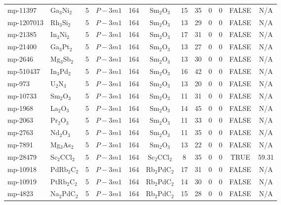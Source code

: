 {\begin{longtable}{llcccccccccc}
    mp-11397 & Ga$_{3}$Ni$_{2}$ & 5     & $P-3m1$ & 164   & Sm$_{2}$O$_{3}$ & 15    & 35    & 0     & 0     & FALSE & N/A \\
    mp-1207013 & Rh$_{3}$Si$_{2}$ & 5     & $P-3m1$ & 164   & Sm$_{2}$O$_{3}$ & 13    & 29    & 0     & 0     & FALSE & N/A \\
    mp-21385 & In$_{3}$Ni$_{2}$ & 5     & $P-3m1$ & 164   & Sm$_{2}$O$_{3}$ & 17    & 31    & 0     & 0     & FALSE & N/A \\
    mp-21400 & Ga$_{3}$Pt$_{2}$ & 5     & $P-3m1$ & 164   & Sm$_{2}$O$_{3}$ & 13    & 27    & 0     & 0     & FALSE & N/A \\
    mp-2646 & Mg$_{3}$Sb$_{2}$ & 5     & $P-3m1$ & 164   & Sm$_{2}$O$_{3}$ & 13    & 30    & 0     & 0     & FALSE & N/A \\
    mp-510437 & In$_{3}$Pd$_{2}$ & 5     & $P-3m1$ & 164   & Sm$_{2}$O$_{3}$ & 16    & 42    & 0     & 0     & FALSE & N/A \\
    mp-973 & U$_{2}$N$_{3}$ & 5     & $P-3m1$ & 164   & Sm$_{2}$O$_{3}$ & 13    & 20    & 0     & 0     & FALSE & N/A \\
    mp-10733 & Sm$_{2}$O$_{3}$ & 5     & $P-3m1$ & 164   & Sm$_{2}$O$_{3}$ & 11    & 31    & 0     & 0     & FALSE & N/A \\
    mp-1968 & La$_{2}$O$_{3}$ & 5     & $P-3m1$ & 164   & Sm$_{2}$O$_{3}$ & 14    & 45    & 0     & 0     & FALSE & N/A \\
    mp-2063 & Pr$_{2}$O$_{3}$ & 5     & $P-3m1$ & 164   & Sm$_{2}$O$_{3}$ & 11    & 33    & 0     & 0     & FALSE & N/A \\
    mp-2763 & Nd$_{2}$O$_{3}$ & 5     & $P-3m1$ & 164   & Sm$_{2}$O$_{3}$ & 11    & 35    & 0     & 0     & FALSE & N/A \\
    mp-7891 & Mg$_{3}$As$_{2}$ & 5     & $P-3m1$ & 164   & Sm$_{2}$O$_{3}$ & 13    & 22    & 0     & 0     & FALSE & N/A \\
    mp-28479 & Sc$_{2}$CCl$_{2}$ & 5     & $P-3m1$ & 164   & Sc$_{2}$CCl$_{2}$ & 8     & 35    & 0     & 0     & TRUE  & 59.31  \\
    mp-10918 & PdRb$_{2}$C$_{2}$ & 5     & $P-3m1$ & 164   & Rb$_{2}$PdC$_{2}$ & 17    & 31    & 0     & 0     & FALSE & N/A \\
    mp-10919 & PtRb$_{2}$C$_{2}$ & 5     & $P-3m1$ & 164   & Rb$_{2}$PdC$_{2}$ & 14    & 30    & 0     & 0     & FALSE & N/A \\
    mp-4823 & Na$_{2}$PdC$_{2}$ & 5     & $P-3m1$ & 164   & Rb$_{2}$PdC$_{2}$ & 15    & 28    & 0     & 0     & FALSE & N/A \\

\end{longtable}}
